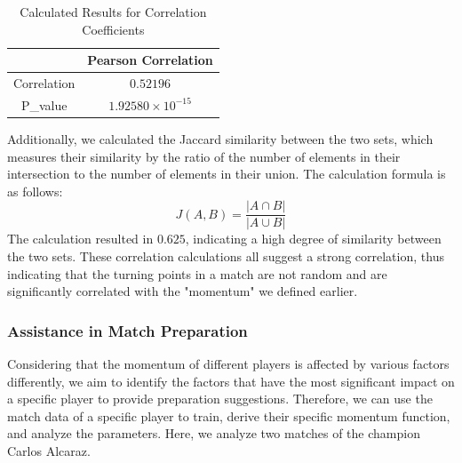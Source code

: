 \documentclass[UTF8]{ctexart} %
\begin{document}
\begin{table}[H]
    \caption{Calculated Results for Correlation Coefficients}
    \centering
    \begin{tabular}{|c|c|}
    \hline
     & Pearson Correlation \\ \hline
    Correlation & $0.52196$ \\ \hline
    P\_value & $1.92580\times10^{-15}$ \\ \hline
    \end{tabular}
\end{table}

Additionally, we calculated the Jaccard similarity between the two sets, which measures their similarity 
by the ratio of the number of elements in their intersection to the number of elements in their union. 
The calculation formula is as follows:
\[J(A,B) = \frac{|A \cap B|}{|A \cup B|}\]
The calculation resulted in \(0.625\), indicating a high degree of similarity between the two sets. These 
correlation calculations all suggest a strong correlation, thus indicating that the turning points in a 
match are not random and are significantly correlated with the "momentum" we defined earlier.

\subsubsection{\textbf{Assistance in Match Preparation}}
Considering that the momentum of different players is affected by various factors differently, we aim to 
identify the factors that have the most significant impact on a specific player to provide preparation 
suggestions. Therefore, we can use the match data of a specific player to train, derive their specific 
momentum function, and analyze the parameters. Here, we analyze two matches of the champion Carlos Alcaraz.
\end{document}
